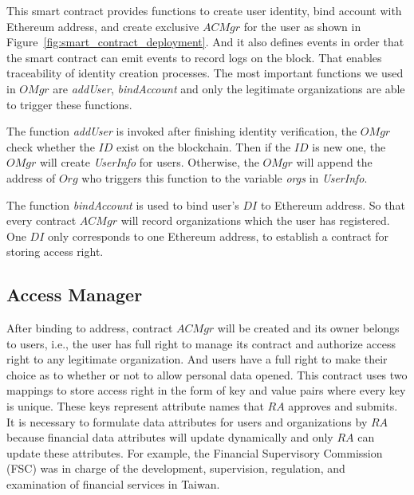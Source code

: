 

This smart contract provides functions to create user identity, bind account with Ethereum address, and create exclusive \(ACMgr\) for the user as shown in Figure~\ref{fig:smart_contract_deployment}. And it also defines events in order that the smart contract can emit events to record logs on the block. That enables traceability of identity creation processes. The most important functions we used in \(OMgr\) are \textit{addUser}, \textit{bindAccount} and only the legitimate organizations are able to trigger these functions.\par 
The function \textit{addUser} is invoked after finishing identity verification, the \(OMgr\) check whether the \(ID\) exist on the blockchain. Then if the \(ID\) is new one, the \(OMgr\) will create \textit{UserInfo} for users. Otherwise, the \(OMgr\) will append the address of \(Org\) who triggers this function to the variable \textit{orgs} in \textit{UserInfo}.\par 
The function \textit{bindAccount} is used to bind user's \(DI\) to Ethereum address. So that every contract \(ACMgr\) will record organizations which the user has registered. One \(DI\) only corresponds to one Ethereum address,  to establish a contract for storing access right.\par 

\subsection*{Access Manager}
After binding to address, contract \(ACMgr\) will be created and its owner belongs to users, i.e., the user has full right to manage its contract and authorize access right to any legitimate organization. And users have a full right to make their choice as to whether or not to allow personal data opened. This contract uses two mappings to store access right in the form of key and value pairs where every key is unique. These keys represent attribute names that \(RA\) approves and submits. It is necessary to formulate data attributes for users and organizations by \(RA\) because financial data attributes will update dynamically and only \(RA\) can update these attributes. For example, the Financial Supervisory Commission (FSC) was in charge of the development, supervision, regulation, and examination of financial services in Taiwan.

